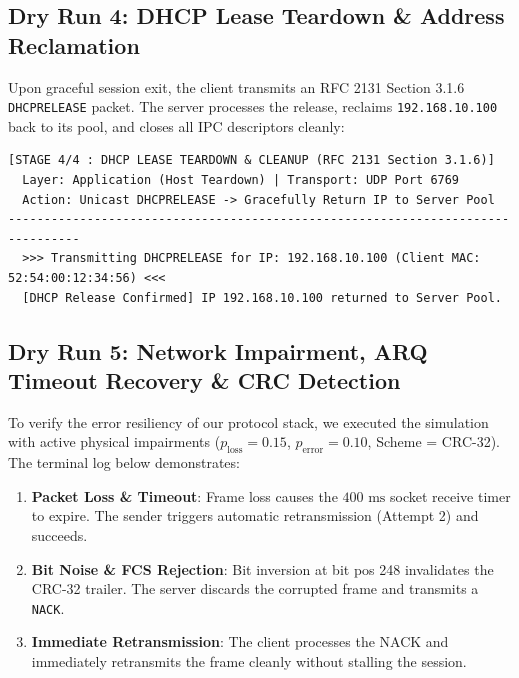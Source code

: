 \documentclass[12pt, a4paper]{article}
\begin{document}
\subsection{Dry Run 4: DHCP Lease Teardown \& Address Reclamation}
Upon graceful session exit, the client transmits an RFC 2131 Section 3.1.6 \texttt{DHCPRELEASE} packet. The server processes the release, reclaims \texttt{192.168.10.100} back to its pool, and closes all IPC descriptors cleanly:

\begin{lstlisting}[style=termstyle, caption=Authentic Terminal Output: DHCP Lease Teardown Trace]
[STAGE 4/4 : DHCP LEASE TEARDOWN & CLEANUP (RFC 2131 Section 3.1.6)]
  Layer: Application (Host Teardown) | Transport: UDP Port 6769
  Action: Unicast DHCPRELEASE -> Gracefully Return IP to Server Pool
--------------------------------------------------------------------------------
  >>> Transmitting DHCPRELEASE for IP: 192.168.10.100 (Client MAC: 52:54:00:12:34:56) <<<
  [DHCP Release Confirmed] IP 192.168.10.100 returned to Server Pool.
\end{lstlisting}

\subsection{Dry Run 5: Network Impairment, ARQ Timeout Recovery \& CRC Detection}
To verify the error resiliency of our protocol stack, we executed the simulation with active physical impairments ($p_{\text{loss}} = 0.15$, $p_{\text{error}} = 0.10$, Scheme = CRC-32). The terminal log below demonstrates:
\begin{enumerate}
    \item \textbf{Packet Loss \& Timeout}: Frame loss causes the $400\text{ ms}$ socket receive timer to expire. The sender triggers automatic retransmission (Attempt 2) and succeeds.
    \item \textbf{Bit Noise \& FCS Rejection}: Bit inversion at bit pos 248 invalidates the CRC-32 trailer. The server discards the corrupted frame and transmits a \texttt{NACK}.
    \item \textbf{Immediate Retransmission}: The client processes the NACK and immediately retransmits the frame cleanly without stalling the session.
\end{enumerate}
\end{document}
